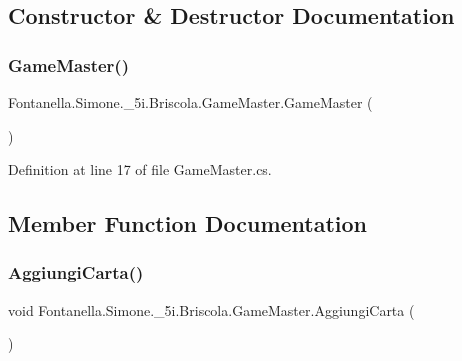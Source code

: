 \subsection{Constructor \& Destructor Documentation}
\hypertarget{class_fontanella_1_1_simone_1_1__5i_1_1_briscola_1_1_game_master_a8ccf5663cf434aba91fb49c93ad1971e}{}\label{class_fontanella_1_1_simone_1_1__5i_1_1_briscola_1_1_game_master_a8ccf5663cf434aba91fb49c93ad1971e} 
\subsubsection{\texorpdfstring{Game\+Master()}{GameMaster()}}
{\footnotesize\ttfamily Fontanella.\+Simone.\+\_\+5i.\+Briscola.\+Game\+Master.\+Game\+Master (\begin{DoxyParamCaption}{ }\end{DoxyParamCaption})}



Definition at line 17 of file Game\+Master.\+cs.



\subsection{Member Function Documentation}
\hypertarget{class_fontanella_1_1_simone_1_1__5i_1_1_briscola_1_1_game_master_a0daac357a7038fb2229cd916050ff1de}{}\label{class_fontanella_1_1_simone_1_1__5i_1_1_briscola_1_1_game_master_a0daac357a7038fb2229cd916050ff1de} 
\subsubsection{\texorpdfstring{Aggiungi\+Carta()}{AggiungiCarta()}}
{\footnotesize\ttfamily void Fontanella.\+Simone.\+\_\+5i.\+Briscola.\+Game\+Master.\+Aggiungi\+Carta (\begin{DoxyParamCaption}{ }\end{DoxyParamCaption})}



